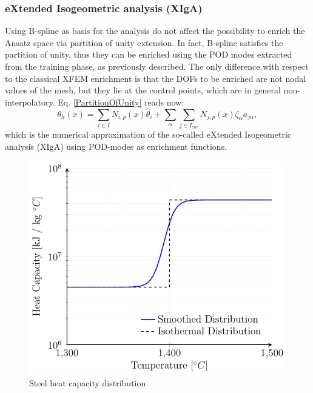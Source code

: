 \documentclass[3p]{article}
\begin{document}
\subsubsection*{eXtended Isogeometric analysis (XIgA)}
Using B-spline as basis for the analysis do not affect the possibility to enrich the Ansatz space via partition of unity extension. In fact, B-spline satisfies the partition of unity, thus they can be enriched using the POD modes extracted from the training phase, as previously described. The only difference with respect to the classical XFEM enrichment is that the DOFs to be enriched are not nodal values of the mesh, but they lie at the control points, which are in general non-interpolatory. Eq. \ref{PartitionOfUnity} reads now:
\begin{equation}
\theta_{h}(x) = \sum_{i\in I} N_{i,p}(x)\hat{\theta}_{i} + \sum_{\alpha}\sum_{j\in I_{enr}} N_{j,p}(x)\zeta_{\alpha}a_{j\alpha},
\label{IgAPartitionOfUnity}
\end{equation}
which is the numerical approximation of the so-called eXtended Isogeometric analysis (XIgA) using POD-modes as enrichment functions.

\begin{figure}[!h]
\centering
  \includegraphics[width=0.5\linewidth]{externals/Pictures/heatCapacity.pdf}
  \caption{Steel heat capacity distribution}
  \label{fig:heatCapacity}
\end{figure}
\end{document}
